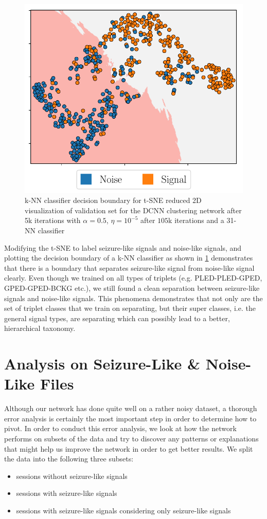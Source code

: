 \begin{figure}[!ht]
	\centering
	\includegraphics[width=0.7\linewidth]{pictures/tsne_plot_binary.pdf}
	\caption[k-NN binary decision boundary on t-SNE reduced embedding]{k-NN classifier decision boundary for t-SNE reduced 2D visualization of validation set for the DCNN clustering network after 5k iterations with $\alpha = 0.5$, $\eta = 10^{-5}$ after $105$k iterations and a 31-NN classifier}\label{fig:tsne_plot_binary}  
\end{figure}

Modifying the t-SNE to label seizure-like signals and noise-like signals, and plotting the decision boundary of a k-NN classifier as shown in \cref{fig:tsne_plot_binary} demonstrates that there is a boundary that separates seizure-like signal from noise-like signal clearly. Even though we trained on all types of triplets (e.g. PLED-PLED-GPED, GPED-GPED-BCKG etc.), we still found a clean separation between seizure-like signals and noise-like signals. This phenomena demonstrates that not only are the set of triplet classes that we train on separating, but their super classes, i.e. the general signal types, are separating which can possibly lead to a better, hierarchical taxonomy. 

\section{Analysis on Seizure-Like \& Noise-Like Files}
\label{analysis}
Although our network has done quite well on a rather noisy dataset, a thorough error analysis is certainly the most important step in order to determine how to pivot. In order to conduct this error analysis, we look at how the network performs on subsets of the data and try to discover any patterns or explanations that might help us improve the network in order to get better results. We split the data into the following three subsets: 
\begin{itemize}
	\setlength\itemsep{1mm}
	\item sessions without seizure-like signals
	\item sessions with seizure-like signals
	\item sessions with seizure-like signals considering only seizure-like signals
\end{itemize}
   
